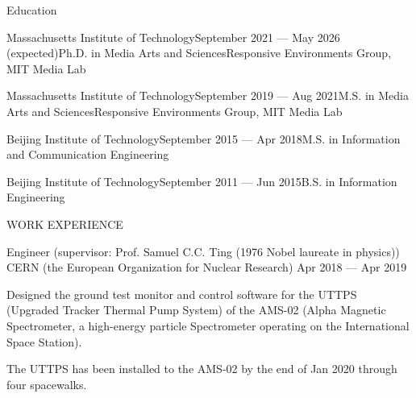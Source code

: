 \documentclass{resume} %
\begin{document}
\begin{rSection}{Education}

\begin{rSubsection}{Massachusetts Institute of Technology}{September 2021 --- May 2026 (expected)}{Ph.D. in Media Arts and Sciences}{Responsive Environments Group, MIT Media Lab}
\vspace{-.65cm}
\item[]
\end{rSubsection}

\begin{rSubsection}{Massachusetts Institute of Technology}{September 2019 --- Aug 2021}{M.S. in Media Arts and Sciences}{Responsive Environments Group, MIT Media Lab}
\vspace{-.65cm}
\item[]
\end{rSubsection}

\begin{rSubsection}{Beijing Institute of Technology}{September 2015 --- Apr 2018}{M.S. in Information and Communication Engineering}{}
\vspace{-.65cm}
\item[]
\end{rSubsection}

\begin{rSubsection}{Beijing Institute of Technology}{September 2011 --- Jun 2015}{B.S. in Information Engineering}{}
\vspace{-.65cm}
\item[]
\end{rSubsection}

\end{rSection}

\begin{rSection}{WORK EXPERIENCE}
\begin{rSubsection}{Engineer (supervisor: Prof. Samuel C.C. Ting (1976 Nobel laureate in physics))}{}
      {CERN (the European Organization for Nuclear Research)}
      {Apr 2018 --- Apr 2019}
\item Designed the ground test monitor and control software for the UTTPS (Upgraded Tracker Thermal Pump System) of the AMS-02
      (Alpha Magnetic Spectrometer, a high-energy particle Spectrometer operating on the International Space Station).
\item The UTTPS has been installed to the AMS-02 by the end of Jan 2020 through four spacewalks.
\end{rSubsection}
\end{rSection}
\end{document}

